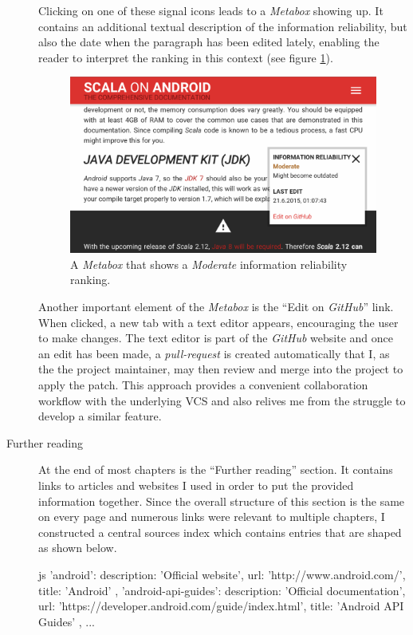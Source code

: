 \begin{description}
	Clicking on one of these signal icons leads to a \textit{Metabox} showing up. It contains an additional textual description of the information reliability, but also the date when the paragraph has been edited lately, enabling the reader to interpret the ranking in this context (see figure \ref{metabox}).

	\begin{figure}[H]
		\includegraphics[width=\textwidth]{asset/metabox.png}
		\caption{A \textit{Metabox} that shows a \textit{Moderate} information reliability ranking.}
		\label{metabox}
	\end{figure}

	Another important element of the \textit{Metabox} is the \enquote{Edit on \textit{GitHub}} link. When clicked, a new tab with a text editor appears, encouraging the user to make changes. The text editor is part of the \textit{GitHub} website and once an edit has been made, a \textit{pull-request} is created automatically that I, as the the project maintainer, may then review and merge into the project to apply the patch. This approach provides a convenient collaboration workflow with the underlying \ac{VCS} and also relives me from the struggle to develop a similar feature.

	\item[Further reading]\hfill

	At the end of most chapters is the \enquote{Further reading} section. It contains links to articles and websites I used in order to put the provided information together. Since the overall structure of this section is the same on every page and numerous links were relevant to multiple chapters, I constructed a central sources index which contains entries that are shaped as shown below.

	\begin{code}{js}
'android':
{
	description: 'Official website',
	url: 'http://www.android.com/',
	title: 'Android'
},
'android-api-guides':
{
	description: 'Official documentation',
	url: 'https://developer.android.com/guide/index.html',
	title: 'Android API Guides'
},
...
	\end{code}


\end{description}
